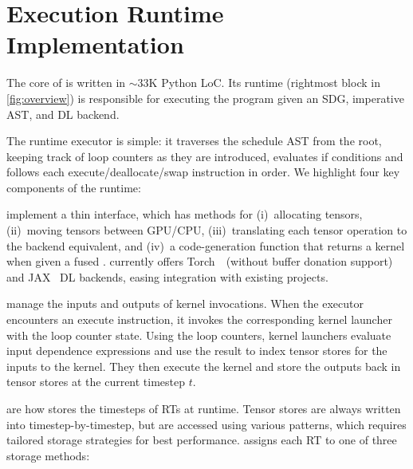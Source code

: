 
\section{Execution Runtime Implementation}
\label{sec:runtime}

The core of \sys{} is written in $\sim$33K Python LoC. Its runtime (rightmost block in \F\ref{fig:overview}) is responsible for executing the program given an SDG, imperative AST, and DL backend.  

The runtime executor is simple: it traverses the schedule AST from the root, keeping track of loop counters as they are introduced, evaluates if conditions and follows each execute/deallocate/swap instruction in order. We highlight four key components of the runtime:

 implement a thin interface, which has methods for (i)~allocating tensors, (ii)~moving tensors between GPU/CPU, (iii)~translating each \sys{} tensor operation to the backend equivalent, and (iv)~a code-generation function that returns a kernel when given a fused . \sys{} currently offers Torch~\cite{paszke2019pytorch}~(without buffer donation support) and JAX~\cite{frostig2018compiling} DL backends, easing integration with existing projects.

 manage the inputs and outputs of kernel invocations. When the executor encounters an execute instruction, it invokes the corresponding kernel launcher with the loop counter state. Using the loop counters, kernel launchers evaluate input dependence expressions and use the result to index tensor stores for the inputs to the kernel. They then execute the kernel and store the outputs back in tensor stores at the current timestep $t$. 

 are how \sys{} stores the timesteps of RTs at runtime. Tensor stores are always written into timestep-by-timestep, but are accessed using various patterns, which requires tailored storage strategies for best performance. 
\sys{} assigns each RT to one of three storage methods:

